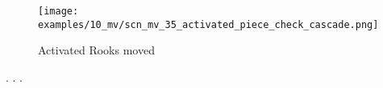 \noindent
\begin{figure}[!h]
\texttt{[image: examples/10\_mv/scn\_mv\_35\_activated\_piece\_check\_cascade.png]}
\caption{Activated Rooks moved}
\label{fig:scn_mv_35_activated_piece_check_cascade}
\end{figure}

. . .






\clearpage %

